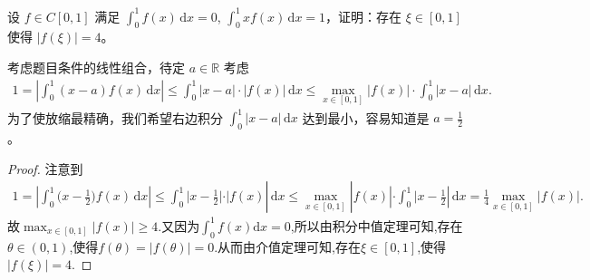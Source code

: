 \documentclass[../../main.tex]{subfiles}
\begin{document}
\begin{example}
设 $f \in C[0,1]$ 满足 $\int_0^1 f(x) \, \mathrm{d}x = 0$, $\int_0^1 xf(x) \, \mathrm{d}x = 1$，证明：存在 $\xi \in [0,1]$ 使得 $|f(\xi)| = 4$。
\end{example}
\begin{note}
考虑题目条件的线性组合，待定 $a \in \mathbb{R}$ 考虑
\begin{align*}
1 = \left| \int_0^1 (x - a)f(x) \, \mathrm{d}x \right| \leq \int_0^1 |x - a| \cdot |f(x)| \, \mathrm{d}x \leq \max_{x \in [0,1]} |f(x)| \cdot \int_0^1 |x - a| \, \mathrm{d}x.
\end{align*}
为了使放缩最精确，我们希望右边积分 $\int_0^1 |x - a| \, \mathrm{d}x$ 达到最小，容易知道是 $a = \frac{1}{2}$。
\end{note}
\begin{proof}
注意到
\begin{align*}
1=\left| \int_0^1{(x}-\frac{1}{2})f(x)\,\mathrm{d}x \right|\le \int_0^1{|x}-\frac{1}{2}|\cdot |f(x)|\,\mathrm{d}x\le \max_{x\in [0,1]} |f(x)|\cdot \int_0^1{|x}-\frac{1}{2}|\,\mathrm{d}x=\frac{1}{4}\max_{x\in [0,1]} |f(x)|.
\end{align*}
故$\max_{x\in [0,1]} |f(x)|\geqslant 4$.又因为$\int_0^1{f(x) \mathrm{d}x}=0$,所以由积分中值定理可知,存在$\theta \in (0,1)$,使得$f(\theta) =\left| f(\theta) \right|=0$.从而由介值定理可知,存在$\xi \in [0,1]$,使得$\left| f(\xi) \right|=4$.
\end{proof}
\end{document}
